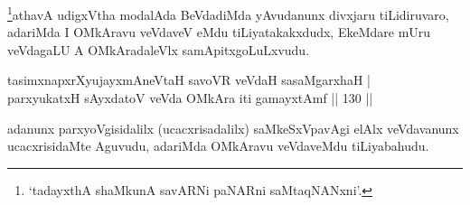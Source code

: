 \begin{artha}
\footnote{`tadayxthA shaMkunA savARNi paNARni saMtaqNANxni'.}athavA udigxVtha modalAda BeVdadiMda yAvudanunx divxjaru tiLidiruvaro, adariMda I OMkAravu veVdaveV eMdu tiLiyatakakxdudx, EkeMdare mUru veVdagaLU A OMkAradaleVlx samApitxgoLuLxvudu.
\end{artha}

\begin{shl}
tasimxnapxrXyujayxmAneV\s taH savoVR veVdaH sasaMgarxhaH   | \\
 parxyukatxH sAyxdatoV veVda OMkAra iti gamayxtAmf \hfill||  130 ||  
\end{shl}

\begin{artha}
adanunx parxyoVgisidalilx (ucacxrisadalilx) saMkeSxVpavAgi elAlx veVdavanunx ucacxrisidaMte Aguvudu, adariMda OMkAravu veVdaveMdu tiLiyabahudu.
\end{artha}

\centerline{}
